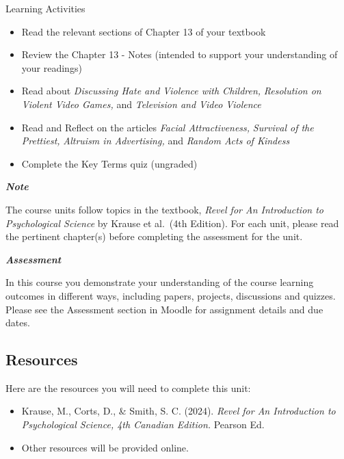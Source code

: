 \documentclass[
]{book}
\providecommand{\tightlist}{%
  \setlength{\itemsep}{0pt}\setlength{\parskip}{0pt}}
\begin{document}
\begin{reflect}
{Learning Activities}

\begin{itemize}
\tightlist
\item
  Read the relevant sections of Chapter 13 of your textbook
\item
  Review the Chapter 13 - Notes (intended to support your understanding of your readings)
\item
  Read about \emph{Discussing Hate and Violence with Children,} \emph{Resolution on Violent Video Games,} and \emph{Television and Video Violence}\\
\item
  Read and Reflect on the articles \emph{Facial Attractiveness,} \emph{Survival of the Prettiest,} \emph{Altruism in Advertising,} and \emph{Random Acts of Kindess}
\item
  Complete the Key Terms quiz (ungraded)
\end{itemize}
\end{reflect}

\begin{caution}
\textbf{\emph{Note}}

The course units follow topics in the textbook, \emph{Revel for An Introduction to Psychological Science} by Krause et al.~(4th Edition). For each unit, please read the pertinent chapter(s) before completing the assessment for the unit.
\end{caution}

\begin{assessment}
\textbf{\emph{Assessment}}

In this course you demonstrate your understanding of the course learning outcomes in different ways, including papers, projects, discussions and quizzes. Please see the Assessment section in Moodle for assignment details and due dates.
\end{assessment}

\hypertarget{resources-6}{%
\subsection*{Resources}\label{resources-6}}

Here are the resources you will need to complete this unit:

\begin{itemize}
\tightlist
\item
  Krause, M., Corts, D., \& Smith, S. C. (2024). \emph{Revel for An Introduction to Psychological Science, 4th Canadian Edition.} Pearson Ed.
\item
  Other resources will be provided online.
\end{itemize}
\end{document}
